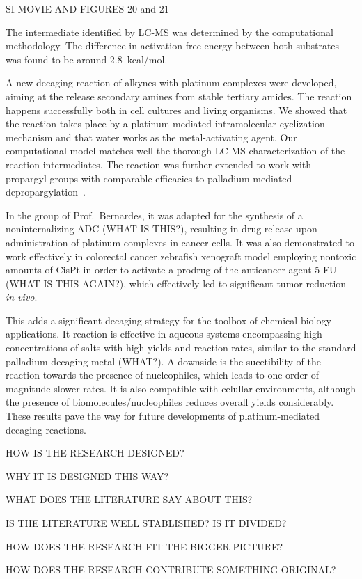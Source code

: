 SI MOVIE AND FIGURES 20 and 21

The intermediate  identified by LC-MS was determined by the computational
methodology.
The difference in activation free energy between both substrates was found to
be around 2.8~kcal/mol.

A new decaging reaction of alkynes with platinum complexes were developed,
aiming at the release secondary amines from stable tertiary amides.
The reaction happens successfully both in cell cultures and living organisms.
We showed that the reaction takes place by a platinum-mediated intramolecular
cyclization mechanism and that water works as the metal-activating agent.
Our computational model matches well the thorough LC-MS characterization of the
reaction intermediates.
The reaction was further extended to work with -propargyl groups with
comparable efficacies to palladium-mediated depropargylation~\cite{Coelho2019}.

In the group of Prof.~Bernardes, it was adapted for the synthesis of a
noninternalizing ADC (WHAT IS THIS?), resulting in drug release upon
administration of platinum complexes in cancer cells.
It was also demonstrated to work effectively in colorectal cancer zebrafish
xenograft model employing nontoxic amounts of CisPt in order to activate a
prodrug of the anticancer agent 5-FU (WHAT IS THIS AGAIN?), which effectively
led to significant tumor reduction \emph{in vivo}.

This adds a significant decaging strategy for the toolbox of chemical biology
applications.
It reaction is effective in aqueous systems encompassing high concentrations of
salts with high yields and reaction rates, similar to the standard palladium
decaging metal (WHAT?).
A downside is the sucetibility of the reaction towards the presence of
nucleophiles, which leads to one order of magnitude slower rates.
It is also compatible with celullar environments, although the presence of
biomolecules/nucleophiles reduces overall yields considerably.
These results pave the way for future developments of platinum-mediated
decaging reactions.

HOW IS THE RESEARCH DESIGNED?\@

WHY IT IS DESIGNED THIS WAY?\@

WHAT DOES THE LITERATURE SAY ABOUT THIS?\@

IS THE LITERATURE WELL STABLISHED?\@
IS IT DIVIDED?\@

HOW DOES THE RESEARCH FIT THE BIGGER PICTURE?\@

HOW DOES THE RESEARCH CONTRIBUTE SOMETHING ORIGINAL?\@

